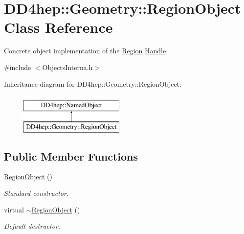 \hypertarget{class_d_d4hep_1_1_geometry_1_1_region_object}{}\section{D\+D4hep\+:\+:Geometry\+:\+:Region\+Object Class Reference}
\label{class_d_d4hep_1_1_geometry_1_1_region_object}


Concrete object implementation of the \hyperlink{class_d_d4hep_1_1_geometry_1_1_region}{Region} \hyperlink{class_d_d4hep_1_1_handle}{Handle}.  




{\ttfamily \#include $<$Objects\+Interna.\+h$>$}

Inheritance diagram for D\+D4hep\+:\+:Geometry\+:\+:Region\+Object\+:\begin{figure}[H]
\begin{center}
\leavevmode
\includegraphics[height=2.000000cm]{class_d_d4hep_1_1_geometry_1_1_region_object}
\end{center}
\end{figure}
\subsection*{Public Member Functions}
\begin{DoxyCompactItemize}
\item 
\hyperlink{class_d_d4hep_1_1_geometry_1_1_region_object_a2ef1c820eaadf3add13852335e791a62}{Region\+Object} ()
\begin{DoxyCompactList}\small\item\em Standard constructor. \end{DoxyCompactList}\item 
virtual \hyperlink{class_d_d4hep_1_1_geometry_1_1_region_object_a254eb8e472a5d43755b32b0f09be6023}{$\sim$\+Region\+Object} ()
\begin{DoxyCompactList}\small\item\em Default destructor. \end{DoxyCompactList}\end{DoxyCompactItemize}
